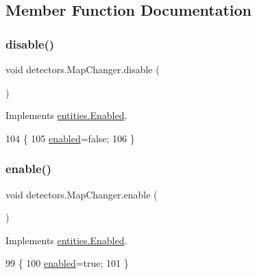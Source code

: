 \subsection{Member Function Documentation}
\mbox{\label{classdetectors_1_1_map_changer_abc1c02ba44ab3c41c5281d4eb18eab63}} 
\subsubsection{\texorpdfstring{disable()}{disable()}}
{\footnotesize\ttfamily void detectors.\+Map\+Changer.\+disable (\begin{DoxyParamCaption}{ }\end{DoxyParamCaption})\hspace{0.3cm}{\ttfamily [inline]}}



Implements \mbox{\hyperlink{interfaceentities_1_1_enabled_a1aad7d7176a83876b92f54e2b31fa1e4}{entities.\+Enabled}}.


\begin{DoxyCode}
104                           \{
105         \mbox{\hyperlink{classdetectors_1_1_map_changer_a603d3a106676167a607d9acd5176f8f8}{enabled}}=\textcolor{keyword}{false};
106     \}
\end{DoxyCode}
\mbox{\label{classdetectors_1_1_map_changer_ac62f6efb8dbbbf91ca21b3789de4f755}} 
\subsubsection{\texorpdfstring{enable()}{enable()}}
{\footnotesize\ttfamily void detectors.\+Map\+Changer.\+enable (\begin{DoxyParamCaption}{ }\end{DoxyParamCaption})\hspace{0.3cm}{\ttfamily [inline]}}



Implements \mbox{\hyperlink{interfaceentities_1_1_enabled_a0c6a44be8f9b87d4e0ddf93dad67232a}{entities.\+Enabled}}.


\begin{DoxyCode}
99                          \{
100         \mbox{\hyperlink{classdetectors_1_1_map_changer_a603d3a106676167a607d9acd5176f8f8}{enabled}}=\textcolor{keyword}{true};
101     \}
\end{DoxyCode}
\mbox{\label{classdetectors_1_1_map_changer_a6aa16432a59706e55237c61cde2e3336}} 

